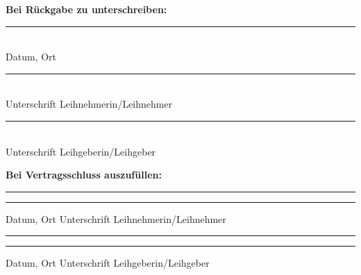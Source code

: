 \documentclass[article, 11pt,a4paper, titlepage, parskip=half, bibliography=totocnumbered]{scrreprt}
\begin{document}
\begin{contract}
\begin{multicols}{2}
							
				\textbf{Bei Rückgabe zu unterschreiben:} \\
				
				
				\noindent\rule{7cm}{.4pt} \\ 
				Datum, Ort \\
				
				\noindent\rule{7cm}{.4pt} \\ 
				Unterschrift Leihnehmerin/Leihnehmer \\
				
				\noindent\rule{7cm}{.4pt} \\ 
				Unterschrift Leihgeberin/Leihgeber \\
		\end{multicols}
		
		\vspace{2 cm} 
		\textbf{Bei Vertragsschluss auszufüllen:}\\
	


	\end{contract}
	\vspace{50pt} 
	\noindent\rule{7cm}{.4pt}\hfill\rule{7cm}{.4pt}\par 
	\noindent Datum, Ort \hfill Unterschrift Leihnehmerin/Leihnehmer
	
	\vspace{50pt} 
	\noindent\rule{7cm}{.4pt}\hfill\rule{7cm}{.4pt}\par 
	\noindent Datum, Ort \hfill Unterschrift Leihgeberin/Leihgeber
	
\end{document}
